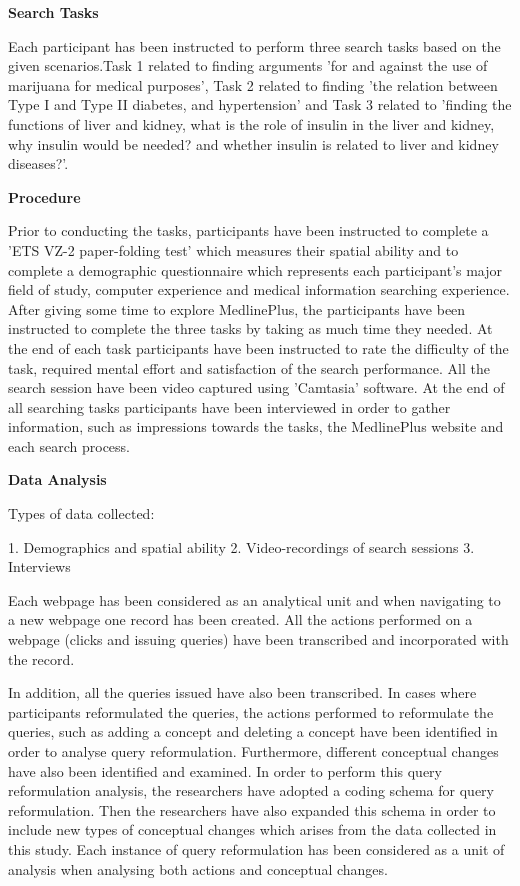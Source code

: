 \documentclass[]{article}
\begin{document}
\textbf{Search Tasks}

Each participant has been instructed to perform three search tasks based on the given scenarios.Task 1 related to finding arguments 'for and against the use of marijuana for medical purposes', Task 2 related to finding 'the relation between Type I and Type II diabetes, and hypertension' and Task 3 related to 'finding the functions of liver and kidney, what is the role of insulin in the liver and kidney, why insulin would be needed? and whether insulin is related to liver and kidney diseases?'.

\textbf{Procedure}

Prior to conducting the tasks, participants have been instructed to complete a 'ETS VZ-2 paper-folding test' which measures their spatial ability and to complete a demographic questionnaire which represents each participant's major field of study, computer experience and medical information searching experience. After giving some time to explore MedlinePlus, the participants have been instructed to complete the three tasks by taking as much time they needed. At the end of each task participants have been instructed to rate the difficulty of the task, required mental effort and satisfaction of the search performance. All the search session have been video captured using 'Camtasia' software. At the end of all searching tasks participants have been interviewed in order to gather information, such as impressions towards the tasks, the MedlinePlus website and each search process. 

\textbf{Data Analysis}     

Types of data collected:

1. Demographics and spatial ability
2. Video-recordings of search sessions
3. Interviews

Each webpage has been considered as an analytical unit and when navigating to a new webpage one record has been created. All the actions performed on a webpage (clicks and issuing queries) have been transcribed and incorporated with the record. 

In addition, all the queries issued have also been transcribed. In cases where participants reformulated the queries, the actions performed to reformulate the queries, such as adding a concept and deleting a concept have been identified in order to analyse query reformulation. Furthermore, different conceptual changes have also been identified and examined. In order to perform this query reformulation analysis, the researchers have adopted a coding schema for query reformulation. Then the researchers have also expanded this schema in order to include new types of conceptual changes which arises from the data collected in this study. Each instance of query reformulation has been considered as a unit of analysis when analysing both actions and conceptual changes.        
\end{document}
